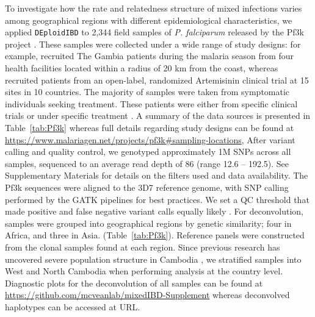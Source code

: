 \documentclass[9pt,lineno]{elife}
\begin{document}
To investigate how the rate and relatedness structure of mixed infections varies among geographical regions with different epidemiological characteristics, we applied \texttt{DEploidIBD} to 2,344 field samples of {\it P. falciparum} released by the Pf3k project \citep{pf3k}.  These samples were collected under a wide range of study designs: for example, \citet{Amambua-Ngwa2012} recruited The Gambia patients during the malaria season from four health facilities located within a radius of 20 km from the coast, whereas \citet{Ashley2014} recruited patients from an open-label, randomized Artemisinin clinical trial at 15 sites in 10 countries. The majority of samples were taken from symptomatic individuals seeking treatment. These patients were either from specific clinical trials \citep{Ocholla2014} or under specific treatment \citep{Duffy2015, Miotto2013, eLife2016}. A summary of the data sources is presented in Table~\ref{tab:Pf3k} whereas full details regarding study designs can be found at \url{https://www.malariagen.net/projects/pf3k#sampling-locations},  After variant calling and quality control, we genotyped approximately 1M SNPs across all samples, sequenced to an average read depth of 86 (range 12.6 -- 192.5).  See Supplementary Materials for details on the filters used and data availability. The Pf3k sequences were aligned to the 3D7 reference genome, with SNP calling performed by the GATK pipelines for best practices. We set a QC threshold that made positive and false negative variant calls equally likely \citep{pf3k}. For deconvolution, samples were grouped into geographical regions by genetic similarity; four in Africa, and three in Asia. (Table~\ref{tab:Pf3k}). Reference panels were constructed from the clonal samples found at each region. Since previous research has uncovered severe population structure in Cambodia \citep{Miotto2013}, we stratified samples into West and North Cambodia when performing analysis at the country level. Diagnostic plots for the deconvolution of all samples can be found at \url{https://github.com/mcveanlab/mixedIBD-Supplement} whereas deconvolved haplotypes can be accessed at URL.
\end{document}
